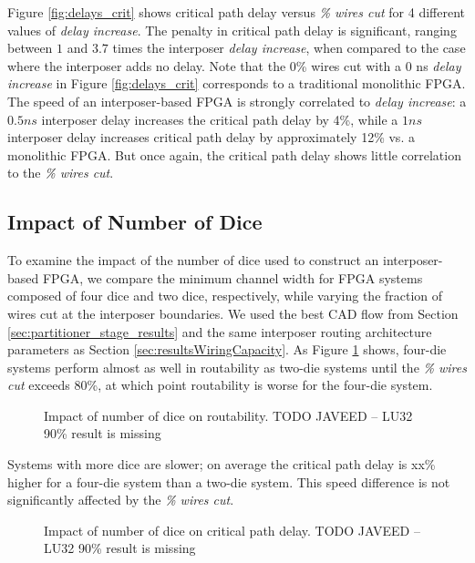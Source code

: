 \documentclass[journal]{IEEEtran}
\begin{document}
Figure \ref{fig:delays_crit} shows critical path delay versus \textit{\% wires cut} for 4 different values of \textit{delay increase}. The penalty in critical path delay is significant, ranging between $1$ and $3.7$ times the interposer \textit{delay increase}, when compared to the case where the interposer adds no delay. Note that the 0\% wires cut with a 0 ns \textit{delay increase} in Figure \ref{fig:delays_crit} corresponds to a traditional monolithic FPGA. The speed of an interposer-based FPGA is strongly correlated to \textit{delay increase}: a $0.5ns$ interposer delay increases the critical path delay by 4\%, while a $1ns$ interposer delay increases critical path delay by approximately 12\% vs. a monolithic FPGA. But once again, the critical path delay shows little correlation to the \textit{\% wires cut}.

\subsection{Impact of Number of Dice}
\label{num_dice_impact}
To examine the impact of the number of dice used to construct an interposer-based FPGA, we compare the minimum channel width for FPGA systems composed of four dice and two dice, respectively, while varying the fraction of wires cut at the interposer boundaries. We used the best CAD flow from Section \ref{sec:partitioner_stage_results} and the same interposer routing architecture parameters as Section \ref{sec:resultsWiringCapacity}. 
As Figure \ref{fig:wires_cut_4part} shows, four-die systems perform almost as well in routability as two-die systems until the \textit{\% wires cut} exceeds 80\%, at which point routability is worse for the four-die system. 

\begin{figure}[!htbp]
\centering

\caption{Impact of number of dice on routability. TODO JAVEED -- LU32 90\% result is missing}
\label{fig:wires_cut_4part}
\end{figure}

Systems with more dice are slower; on average the critical path delay is xx\% higher for a four-die system than a two-die system. This speed difference is not significantly affected by the \textit{\% wires cut}.
\begin{figure}[!htbp]
\centering

\caption{Impact of number of dice on critical path delay. TODO JAVEED -- LU32 90\% result is missing}
\label{fig:crit_path_4part}
\end{figure}
\end{document}
